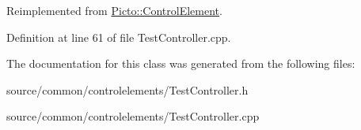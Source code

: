 Reimplemented from \hyperlink{class_picto_1_1_control_element_a29316418d618837adeebf47bb8d58308}{Picto\-::\-Control\-Element}.



Definition at line 61 of file Test\-Controller.\-cpp.



The documentation for this class was generated from the following files\-:\begin{DoxyCompactItemize}
\item 
source/common/controlelements/Test\-Controller.\-h\item 
source/common/controlelements/Test\-Controller.\-cpp\end{DoxyCompactItemize}
